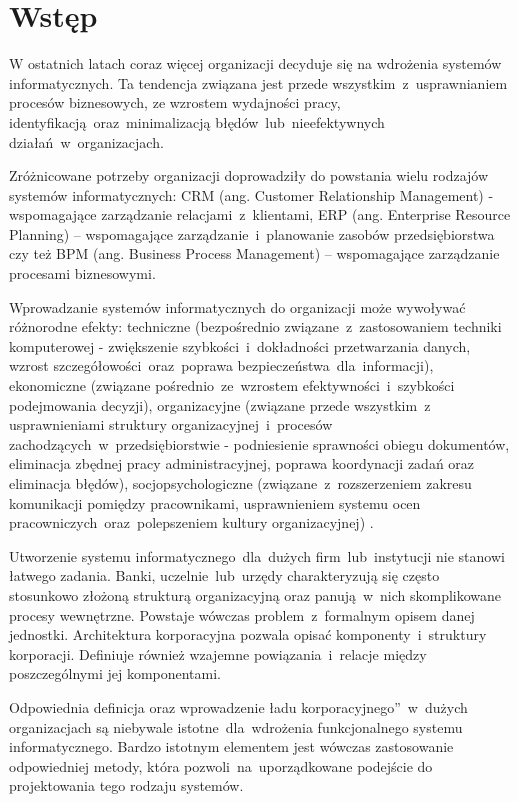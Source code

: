 \chapter{Wstęp}
W ostatnich latach coraz więcej organizacji decyduje się na wdrożenia systemów informatycznych. Ta tendencja związana jest przede wszystkim~z~usprawnianiem procesów biznesowych, ze wzrostem wydajności pracy, identyfikacją~oraz~minimalizacją błędów~lub~nieefektywnych działań~w~organizacjach.

Zróżnicowane potrzeby organizacji doprowadziły do powstania wielu rodzajów systemów informatycznych: CRM (ang. Customer Relationship Management) - wspomagające zarządzanie relacjami~z~klientami, ERP (ang. Enterprise Resource Planning) – wspomagające zarządzanie~i~planowanie zasobów przedsiębiorstwa czy też BPM (ang. Business Process Management) – wspomagające zarządzanie procesami biznesowymi. 

Wprowadzanie systemów informatycznych do organizacji może wywoływać różnorodne efekty: techniczne (bezpośrednio związane~z~zastosowaniem techniki komputerowej - zwiększenie szybkości~i~dokładności przetwarzania danych, wzrost szczegółowości~oraz~poprawa bezpieczeństwa~dla~informacji), ekonomiczne (związane pośrednio~ze~wzrostem efektywności~i~szybkości podejmowania decyzji), organizacyjne (związane przede wszystkim~z~ usprawnieniami struktury organizacyjnej~i~procesów zachodzących~w~przedsiębiorstwie - podniesienie sprawności obiegu dokumentów, eliminacja zbędnej pracy administracyjnej, poprawa koordynacji zadań oraz eliminacja błędów), socjopsychologiczne (związane~z~rozszerzeniem zakresu komunikacji pomiędzy pracownikami, usprawnieniem systemu ocen pracowniczych~oraz~polepszeniem kultury organizacyjnej) \cite{EfektyZasSys}.

Utworzenie systemu informatycznego~dla~dużych firm~lub~instytucji nie stanowi łatwego zadania. Banki, uczelnie~lub~urzędy charakteryzują się często stosunkowo złożoną strukturą organizacyjną oraz panują~w~nich skomplikowane procesy wewnętrzne. Powstaje wówczas problem~z~formalnym opisem danej jednostki. Architektura korporacyjna pozwala opisać komponenty~i~struktury korporacji. Definiuje również wzajemne powiązania~i~relacje między poszczególnymi jej komponentami. 
 
Odpowiednia definicja oraz wprowadzenie \quotedblbase ładu korporacyjnego\textquotedblright~w~dużych organizacjach są niebywale istotne~dla~wdrożenia funkcjonalnego systemu informatycznego. Bardzo istotnym elementem jest wówczas zastosowanie odpowiedniej metody, która pozwoli~na~uporządkowane podejście do projektowania tego rodzaju systemów.

